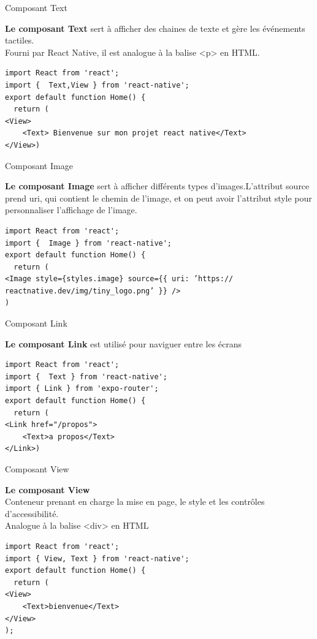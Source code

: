 \documentclass[5pt]{beamer}
\begin{document}
{\begin{frame}[fragile]{Composant Text}
\begin{block}{}
\textbf{Le composant Text} sert à afficher des chaines de texte et gère les événements tactiles.\\
Fourni par React Native, il est analogue à la balise <p> en
HTML.
\begin{verbatim}
import React from 'react';
import {  Text,View } from 'react-native';
export default function Home() {
  return ( 
<View>
	<Text> Bienvenue sur mon projet react native</Text>
</View>)
\end{verbatim}

    \end{block}
\end{frame}

\begin{frame}[fragile]{Composant Image}
\begin{block}{}
\textbf{Le composant Image}  sert à afficher différents types
d’images.L’attribut source prend uri, qui contient le chemin de
l’image, et on peut avoir l’attribut style pour personnaliser
l’affichage de l’image.
\begin{verbatim}
import React from 'react';
import {  Image } from 'react-native';
export default function Home() {
  return (
<Image style={styles.image} source={{ uri: ’https://
reactnative.dev/img/tiny_logo.png’ }} />
)
\end{verbatim}


    \end{block}
\end{frame}
\begin{frame}[fragile]{Composant Link}
\begin{block}{}
\textbf{Le composant Link}  est utilisé pour naviguer entre les écrans
\begin{verbatim}
import React from 'react';
import {  Text } from 'react-native';
import { Link } from 'expo-router'; 
export default function Home() {
  return ( 
<Link href="/propos">
	<Text>a propos</Text>
</Link>)
\end{verbatim}


    \end{block}
\end{frame}

\begin{frame}[fragile]{Composant View}
\begin{block}{}
\textbf{Le composant View}\\
Conteneur prenant en charge la mise en page, le style et les
contrôles d’accessibilité.\\
Analogue à la balise <div> en HTML
\begin{verbatim}
import React from 'react';
import { View, Text } from 'react-native';
export default function Home() {
  return (
<View>
	<Text>bienvenue</Text>
</View>
);
\end{verbatim}
\end{block}
\end{frame}

}
\end{document}

